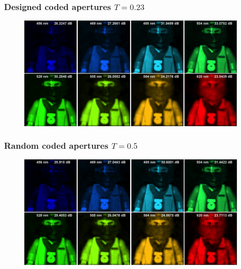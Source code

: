 \documentclass{beamer}
\begin{document}

\begin{frame}
\frametitle{Designed coded apertures $T=0.23$}

\begin{figure}
\centering
\includegraphics[scale=0.30]{FiguresUpd/Sim_desig023.png}
\end{figure}
\end{frame}


\begin{frame}
\frametitle{Random coded apertures $T=0.5$}

\begin{figure}
\centering
\includegraphics[scale=0.30]{FiguresUpd/Sim_rand05.png}
\end{figure}
\end{frame}
\end{document}
